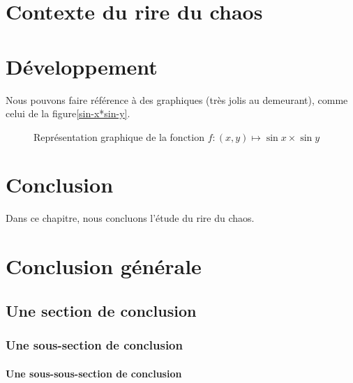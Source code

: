 \documentclass[12pt,space=onehalf,version=final]{yathesis}
\begin{document}
\chapter{Contexte du rire du chaos}

\lipsum[26-32]
%
\chapter{Développement}

Nous pouvons faire référence à des graphiques (très jolis au demeurant), comme
celui de la figure\vref{sin-x*sin-y}.
\lipsum[3-10]
\begin{figure}[ht]
  \centering
  \capstart
  \caption{Représentation graphique de la fonction $f:(x,y)\mapsto
    \sin x\times\sin y$}
  \label{sin-x*sin-y}
\end{figure}
%
\chapter{Conclusion}
Dans ce chapitre, nous concluons l'étude du rire du chaos.

\lipsum[6-9]
%
\chapter*{Conclusion générale}
\lipsum[26-27]
\section{Une section de conclusion}
\lipsum[28-29]
\subsection{Une sous-section de conclusion}
\lipsum[29-31]
\subsubsection{Une sous-sous-section de conclusion}
\lipsum[31-35]
\end{document}
